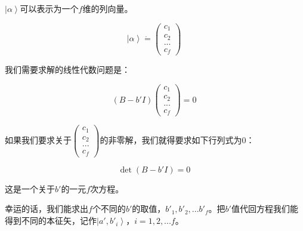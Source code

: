 $\left| \alpha \right\rangle$可以表示为一个$f$维的列向量。

\begin{equation}
\left| \alpha \right\rangle \dot = \left( \begin{array}{ccc} c_1 \\ c_2 \\ ... \\ c_f  \end{array} \right)~
\end{equation}

我们需要求解的线性代数问题是：

\begin{equation}
\left( B - b' I \right) \left( \begin{array}{ccc} c_1 \\ c_2 \\ ... \\ c_f  \end{array} \right)  = 0~
\end{equation}

如果我们要求关于$\left( \begin{array}{ccc} c_1 \\ c_2 \\ ... \\ c_f  \end{array} \right)$的非零解，我们就得要求如下行列式为0：

\begin{equation}
\det \left( B - b' I \right) = 0~
\end{equation}

这是一个关于$b'$的一元$f$次方程。

幸运的话，我们能求出$f$个不同的$b'$的取值，$b'_1, b'_2, ... b'_f$。把$b'$值代回方程我们能得到不同的本征矢，记作$\left| a', b'_i \right\rangle$，$i = 1, 2, ...f$。

